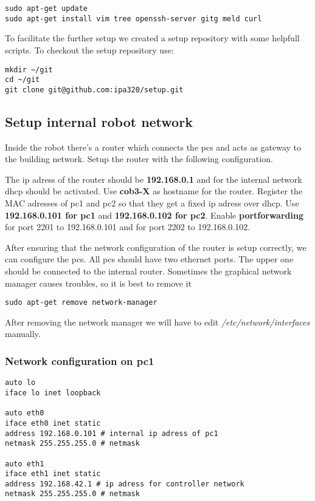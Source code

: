 \begin{lstlisting}
sudo apt-get update
sudo apt-get install vim tree openssh-server gitg meld curl
\end{lstlisting}

To facilitate the further setup we created a setup repository with some helpfull scripts. To checkout the setup repository use:

\begin{lstlisting}
mkdir ~/git
cd ~/git
git clone git@github.com:ipa320/setup.git	
\end{lstlisting}

\subsection{Setup internal robot network}
Inside the robot there's a router which connects the pcs and acts as gateway to the building network. Setup the router with the following configuration. 

The ip adress of the router should be \textbf{192.168.0.1} and for the internal network dhcp should be activated. Use \textbf{cob3-X} as hostname for the router. Register the MAC adresses of pc1 and pc2 so that they get a fixed ip adress over dhcp. Use \textbf{192.168.0.101 for pc1} and \textbf{192.168.0.102 for pc2}. Enable \textbf{portforwarding} for port 2201 to 192.168.0.101 and for port 2202 to 192.168.0.102.

After ensuring that the network configuration of the router is setup correctly, we can configure the pcs. All pcs should have two ethernet ports. The upper one should be connected to the internal router. Sometimes the graphical network manager causes troubles, so it is best to remove it

\begin{lstlisting}
sudo apt-get remove network-manager
\end{lstlisting}

After removing the network manager we will have to edit \textit{/etc/network/interfaces} manually. 

\subsubsection{Network configuration on pc1}

\begin{lstlisting}
auto lo
iface lo inet loopback

auto eth0
iface eth0 inet static
address 192.168.0.101 # internal ip adress of pc1
netmask 255.255.255.0 # netmask

auto eth1
iface eth1 inet static
address 192.168.42.1 # ip adress for controller network
netmask 255.255.255.0 # netmask
\end{lstlisting}

